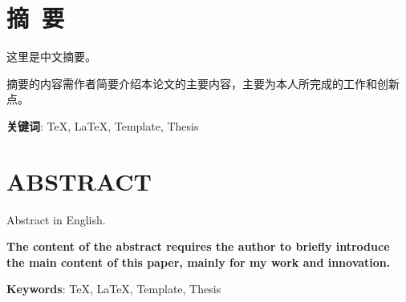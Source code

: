 \newpage

\setcounter{page}{1} %

{
\let\clearpage\relax%
\chapter*{摘\ 要}
}

这里是中文摘要。

摘要的内容需作者简要介绍本论文的主要内容，主要为本人所完成的工作和创新
点。

\vspace{8mm}
\textbf{关键词}: \TeX, \LaTeX, Template, Thesis

\newpage
{
\let\clearpage\relax%
\chapter*{ABSTRACT}
}

Abstract in English.

\textbf{The content of the abstract requires the author to briefly introduce the main content of this paper, mainly for my work and innovation.}

\vspace{8mm}

\textbf{Keywords}: \TeX, \LaTeX, Template, Thesis
